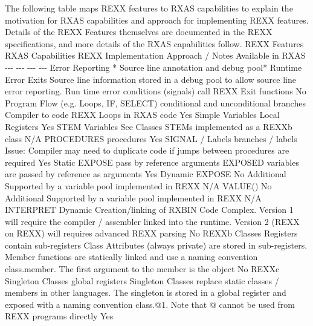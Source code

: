 The following table maps REXX features to RXAS capabilities to explain the motivation for RXAS capabilities and approach for implementing REXX features. Details of the REXX Features themselves are documented in the REXX specifications, and more details of the RXAS capabilities follow.
\textbar{} REXX Features \textbar{} RXAS Capabilities \textbar{} REXX Implementation Approach / Notes \textbar{} Available in RXAS \textbar{}
\textbar{} -{}-{}- \textbar{} -{}-{}- \textbar{} -{}-{}- \textbar{} -{}-{}- \textbar{}
\textbar{} Error Reporting \textbar{} * Source line annotation and debug pool* Runtime Error Exits \textbar{} Source line information stored in a \textquotedbl{}debug\textquotedbl{} pool to allow source line error reporting. Run time error conditions (signals) call REXX Exit functions \textbar{} No \textbar{}
\textbar{} Program Flow (e.g. Loops, IF, SELECT) \textbar{} conditional and unconditional branches \textbar{} Compiler to code REXX Loops in RXAS code \textbar{} Yes \textbar{}
\textbar{} Simple Variables \textbar{} Local Registers \textbar{} \textbar{} Yes \textbar{}
\textbar{} STEM Variables \textbar{} See Classes \textbar{} STEMs implemented as a REXXb class \textbar{} N/A \textbar{}
\textbar{} PROCEDURES \textbar{} procedures \textbar{}\textbar{} Yes \textbar{}
\textbar{} SIGNAL / Labels \textbar{} branches / labels \textbar{} Issue: Compiler may need to duplicate code if jumps between procedures are required \textbar{} Yes \textbar{}
\textbar{} Static EXPOSE \textbar{} pass by reference arguments \textbar{} EXPOSED variables are passed by reference as arguments \textbar{} Yes \textbar{}
\textbar{} Dynamic EXPOSE \textbar{} No Additional \textbar{} Supported by a variable pool implemented in REXX \textbar{} N/A \textbar{}
\textbar{} VALUE() \textbar{} No Additional \textbar{} Supported by a variable pool implemented in REXX \textbar{} N/A \textbar{}
\textbar{} INTERPRET \textbar{} Dynamic Creation/linking of RXBIN Code \textbar{} Complex. Version 1 will require the compiler / assembler linked into the runtime. Version 2 (REXX on REXX) will requires advanced REXX parsing \textbar{} No \textbar{}
\textbar{} REXXb Classes \textbar{} Registers contain sub-registers \textbar{} Class Attributes (always private) are stored in sub-registers. Member functions are statically linked and use a naming convention \textquotedbl{}class.member\textquotedbl{}. The first argument to the member is the object \textbar{} No \textbar{}
\textbar{} REXXc Singleton Classes \textbar{} global registers \textbar{} Singleton Classes replace static classes / members in other languages. The singleton is stored in a global register and exposed with a naming convention \textquotedbl{}class.@1\textquotedbl{}. Note that \textquotedbl{}@\textquotedbl{} cannot be used from REXX programs directly \textbar{} Yes \textbar{}
